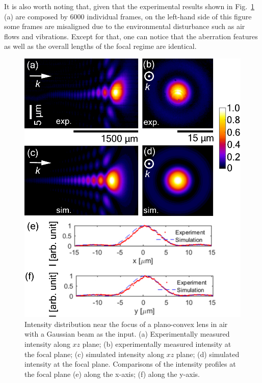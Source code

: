\documentclass[9pt,twocolumn,twoside]{osajnl}
\begin{document}
It is also worth noting that, given that the experimental results shown in Fig.~\ref{fig:3} (a) are composed by 6000 individual frames, on the left-hand side of this figure some frames are misaligned due to the environmental disturbance such as air flows and vibrations.    
Except for that, one can notice that the aberration features as well as the overall lengths of the focal regime are identical.

\begin{figure}[t]
	\centering
	\includegraphics[width=\linewidth]{LA1951air.pdf}
	\caption{Intensity distribution near the focus of a plano-convex lens in air with a Gaussian beam as the input. (a) Experimentally measured intensity along $xz$ plane; (b) experimentally measured intensity at the focal plane; (c) simulated intensity along $xz$ plane; (d) simulated intensity at the focal plane. Comparisons of the intensity profiles at the focal plane (e) along the x-axis; (f) along the y-axis.}\label{fig:3}
\end{figure}
\end{document}
